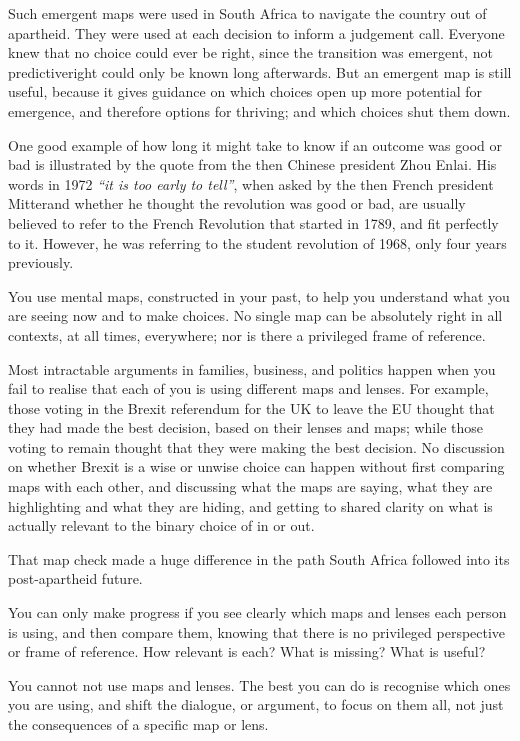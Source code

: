 Such emergent maps were used in South Africa to navigate the country out of apartheid. They were used at each decision to inform a judgement call. Everyone knew that no choice could ever be right, since the transition was emergent, not predictive\textemdash right could only be known long afterwards. But an emergent map is still useful, because it gives guidance on which choices open up more potential for emergence, and therefore options for thriving; and which choices shut them down.


One good example of how long it might take to know if an outcome was good or bad is illustrated by the quote from the then Chinese president Zhou Enlai. His words in 1972 \emph{“it is too early to tell”}, when asked by the then French president Mitterand whether he thought the revolution was good or bad, are usually believed to refer to the French Revolution that started in 1789, and fit perfectly to it. However, he was referring to the student revolution of 1968, only four years previously.


You use mental maps, constructed in your past, to help you understand what you are seeing now and to make choices. No single map can be absolutely right in all contexts, at all times, everywhere; nor is there a privileged frame of reference. 


Most intractable arguments in families, business, and politics happen when you fail to realise that each of you is using different maps and lenses. For example, those voting in the Brexit referendum for the UK to leave the EU thought that they had made the best decision, based on their lenses and maps; while those voting to remain thought that they were making the best decision. No discussion on whether Brexit is a wise or unwise choice can happen without first comparing maps with each other, and discussing what the maps are saying, what they are highlighting and what they are hiding, and getting to shared clarity on what is actually relevant to the binary choice of in or out. 


That map check made a huge difference in the path South Africa followed into its post-apartheid future.


You can only make progress if you see clearly which maps and lenses each person is using, and then compare them, knowing that there is no privileged perspective or frame of reference. How relevant is each? What is missing? What is useful?


You cannot not use maps and lenses. The best you can do is recognise which ones you are using, and shift the dialogue, or argument, to focus on them all, not just the consequences of a specific map or lens. 


